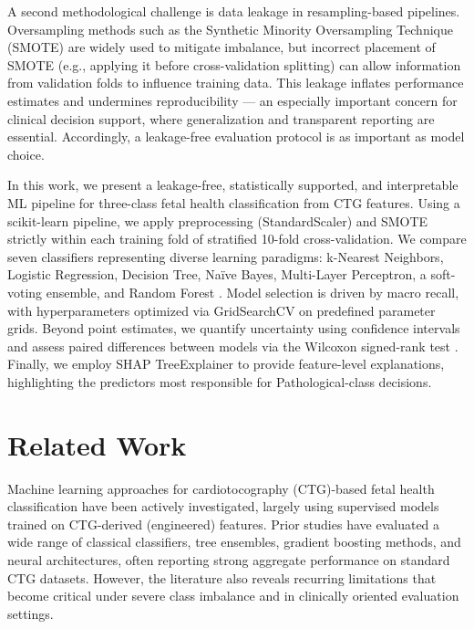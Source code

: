 \documentclass[sigconf]{acmart}
\begin{document}
A second methodological challenge is data leakage in resampling-based pipelines. Oversampling methods such as the Synthetic Minority Oversampling Technique (SMOTE) \cite{chawla2002} are widely used to mitigate imbalance, but incorrect placement of SMOTE (e.g., applying it before cross-validation splitting) can allow information from validation folds to influence training data. This leakage inflates performance estimates and undermines reproducibility — an especially important concern for clinical decision support, where generalization and transparent reporting are essential. Accordingly, a leakage-free evaluation protocol is as important as model choice.

In this work, we present a leakage-free, statistically supported, and interpretable ML pipeline for three-class fetal health classification from CTG features. Using a scikit-learn \cite{pedregosa2011} pipeline, we apply preprocessing (StandardScaler) and SMOTE strictly within each training fold of stratified 10-fold cross-validation. We compare seven classifiers representing diverse learning paradigms: k-Nearest Neighbors, Logistic Regression, Decision Tree, Naïve Bayes, Multi-Layer Perceptron, a soft-voting ensemble, and Random Forest \cite{breiman2001}. Model selection is driven by macro recall, with hyperparameters optimized via GridSearchCV on predefined parameter grids. Beyond point estimates, we quantify uncertainty using confidence intervals and assess paired differences between models via the Wilcoxon signed-rank test \cite{wilcoxon1945}. Finally, we employ SHAP TreeExplainer \cite{lundberg2017} to provide feature-level explanations, highlighting the predictors most responsible for Pathological-class decisions.

\section{Related Work}
\label{sec:related_work}

Machine learning approaches for cardiotocography (CTG)-based fetal health classification have been actively investigated, largely using supervised models trained on CTG-derived (engineered) features. Prior studies have evaluated a wide range of classical classifiers, tree ensembles, gradient boosting methods, and neural architectures, often reporting strong aggregate performance on standard CTG datasets. However, the literature also reveals recurring limitations that become critical under severe class imbalance and in clinically oriented evaluation settings.
\end{document}

